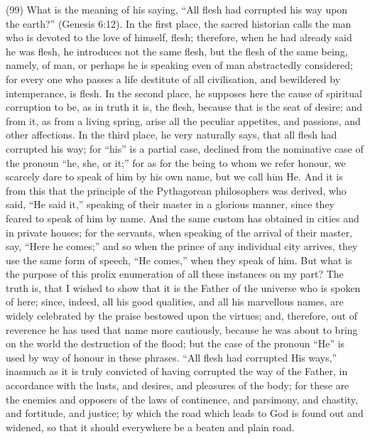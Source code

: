 (99) What is the meaning of his saying, ``All flesh had corrupted his way upon the earth?'' (Genesis
6:12). In the first place, the sacred historian calls the man who is devoted to the love of himself,
flesh; therefore, when he had already said he was flesh, he introduces not the same flesh, but the
flesh of the same being, namely, of man, or perhaps he is speaking even of man abstractedly
considered; for every one who passes a life destitute of all civilisation, and bewildered by
intemperance, is flesh. In the second place, he supposes here the cause of spiritual corruption to
be, as in truth it is, the flesh, because that is the seat of desire; and from it, as from a living spring,
arise all the peculiar appetites, and passions, and other affections. In the third place, he very
naturally says, that all flesh had corrupted his way; for ``his'' is a partial case, declined from the
nominative case of the pronoun ``he, she, or it;'' for as for the being to whom we refer honour, we
scarcely dare to speak of him by his own name, but we call him He. And it is from this that the
principle of the Pythagorean philosophers was derived, who said, ``He said it,'' speaking of their
master in a glorious manner, since they feared to speak of him by name. And the same custom
has obtained in cities and in private houses; for the servants, when speaking of the arrival of their
master, say, ``Here he comes;'' and so when the prince of any individual city arrives, they use the
same form of speech, ``He comes,'' when they speak of him. But what is the purpose of this prolix
enumeration of all these instances on my part? The truth is, that I wished to show that it is the
Father of the universe who is spoken of here; since, indeed, all his good qualities, and all his
marvellous names, are widely celebrated by the praise bestowed upon the virtues; and, therefore,
out of reverence he has used that name more cautiously, because he was about to bring on the
world the destruction of the flood; but the case of the pronoun ``He'' is used by way of honour in
these phrases. ``All flesh had corrupted His ways,'' inasmuch as it is truly convicted of having
corrupted the way of the Father, in accordance with the lusts, and desires, and pleasures of the
body; for these are the enemies and opposers of the laws of continence, and parsimony, and
chastity, and fortitude, and justice; by which the road which leads to God is found out and widened,
so that it should everywhere be a beaten and plain road.

